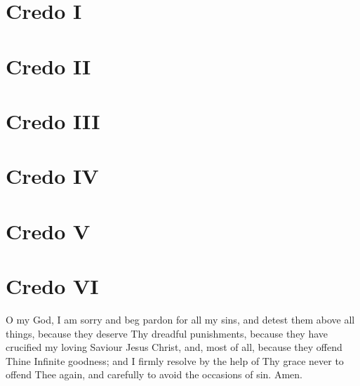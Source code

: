 




\bigskip


\section{Credo I}



\section{Credo II}



\section{Credo III}



\section{Credo IV}


\section{Credo V}



\section{Credo VI}


\gresetfirstlineaboveinitial{}{}


\vfill




O my God, I am sorry and beg pardon for all my sins, and detest them above all things, because they deserve Thy dreadful punishments, because they have crucified my loving Saviour Jesus Christ, and, most of all, because they offend Thine Infinite goodness; and I firmly resolve by the help of Thy grace never to offend Thee again, and carefully to avoid the occasions of sin.  Amen.


